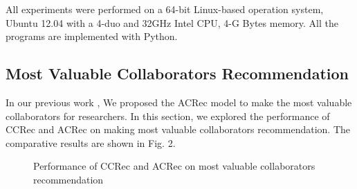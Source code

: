 \documentclass{acm_proc_article-sp}
\begin{document}
All experiments were performed on a 64-bit Linux-based operation system, Ubuntu 12.04 with a 4-duo and 32GHz Intel CPU, 4-G Bytes memory. All the programs are implemented with Python.

\subsection{Most Valuable Collaborators Recommendation}
In our previous work \cite{li2014acrec}, We proposed the ACRec model to make the most valuable collaborators for researchers. In this section, we explored the performance of CCRec and ACRec on making most valuable collaborators recommendation. The comparative results are shown in Fig. 2.

\begin{figure}
\centering
{}
\caption{Performance of CCRec and ACRec on most valuable collaborators recommendation}
\label{fig:2}
\end{figure}
\end{document}
